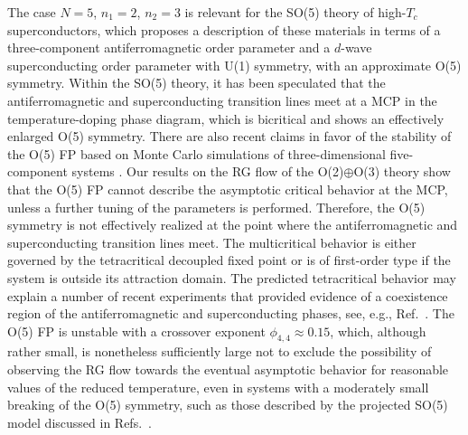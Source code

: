 \documentclass[a4paper,12pt]{article}
\begin{document}
The case $N=5$, $n_1=2$, $n_2=3$ is relevant for the 
SO(5) theory \cite{Zhang-97,ZHAHA-99} of high-$T_c$ superconductors,
which proposes a description of these materials in terms of a three-component
antiferromagnetic order parameter and 
a $d$-wave superconducting order parameter with U(1) symmetry,
with an approximate O(5) symmetry.
Within the SO(5) theory, it has been speculated that 
the antiferromagnetic and superconducting transition lines meet
at a MCP in the temperature-doping phase diagram,
which is bicritical and shows an effectively enlarged O(5) symmetry.
There are also recent claims in favor of the stability of the
O(5) FP based on Monte Carlo simulations
of three-dimensional five-component systems \cite{Hu-01}.
Our results on the RG flow of the O(2)$\oplus$O(3) theory
show that the O(5) FP cannot describe the asymptotic critical behavior
at the MCP, unless a further tuning of the parameters is performed.
Therefore, the O(5) symmetry is not effectively realized at the 
point where the antiferromagnetic and superconducting transition 
lines meet. The multicritical behavior is either governed by the tetracritical
decoupled fixed point or is of first-order type if the system is outside 
its attraction domain.
The predicted tetracritical behavior may explain a number of recent experiments
that provided evidence of a coexistence region
of the antiferromagnetic and superconducting phases, see, e.g., 
Ref.~\cite{ZDS-02}.
The O(5) FP is unstable with a crossover exponent $\phi_{4,4}\approx 0.15$,
which, although rather small, is nonetheless sufficiently large  
not to exclude the possibility of observing 
the RG flow towards the eventual asymptotic behavior 
for reasonable values of the reduced temperature,
even in systems with a moderately small breaking of the O(5) symmetry,
such as those described by the projected SO(5) model discussed in 
Refs.~\cite{ZHAHA-99,Dorneich-etal-02}.


\end{document}

